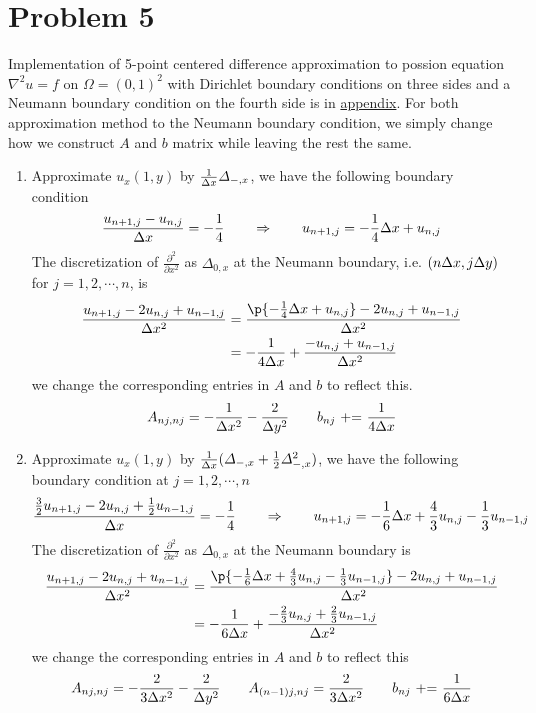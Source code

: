 \documentclass[11pt]{article}
\begin{document}
\section*{Problem 5}
Implementation of 5-point centered difference approximation to possion equation $\nabla^2 u = f$ on $\Omega = (0,1)^2$ with Dirichlet boundary conditions on three sides and a Neumann boundary condition on the fourth side is in \hyperref[q5code]{appendix}. For both approximation method to the Neumann boundary condition, we simply change how we construct $A$ and $b$ matrix while leaving the rest the same. 
\begin{enumerate}
    \item {} Approximate $u_x(1,y)$ by $\textstyle\frac{1}{\Delta x} \varDelta_{-,x}$, we have the following boundary condition
    \begin{equation}\label{eq1}
        \frac{u_{n+1,j} - u_{n,j}}{\Delta x} = -\frac{1}{4}
        \quad \quad \Rightarrow \quad \quad
        u_{n+1,j} = -\frac{1}{4} \Delta x + u_{n,j}
    \end{equation}
    The discretization of $\textstyle\frac{\partial^2}{\partial x^2}$ as $\varDelta_{0,x}$ at the Neumann boundary, i.e. $(n\Delta x, j\Delta y)$ for $j=1,2,\cdots,n$, is
    \begin{align*}
        \frac{u_{n+1,j} - 2u_{n,j} + u_{n-1,j}}{\Dx^2}
            &= \frac{\p{-\frac{1}{4} \Dx + u_{n,j}} - 2u_{n,j} + u_{n-1,j}}{\Dx^2} \\
            &= -\frac{1}{4\Dx} + \frac{-u_{n,j} + u_{n-1,j}}{\Dx^2}
    \end{align*}
    we change the corresponding entries in $A$ and $b$ to reflect this.
    \[
        A_{nj,nj} = -\frac{1}{\Delta x^2} - \frac{2}{\Delta y^2}
        \quad \quad
        b_{nj} \text{ += } \frac{1}{4\Delta x}
    \]
    \item {} Approximate $u_x(1,y)$ by $\textstyle\frac{1}{\Delta x} (\varDelta_{-,x} + \frac{1}{2} \varDelta^2_{-,x})$, we have the following boundary condition at $j=1,2,\cdots, n$
    \begin{equation} \label{eq2}
        \frac{\frac{3}{2} u_{n+1,j} - 2u_{n,j} + \frac{1}{2}u_{n-1,j}}{\Delta x} = -\frac{1}{4}
        \quad \quad \Rightarrow \quad \quad
        u_{n+1,j} = -\frac{1}{6} \Delta x + \frac{4}{3} u_{n,j} - \frac{1}{3} u_{n-1,j}
    \end{equation}
    The discretization of $\textstyle\frac{\partial^2}{\partial x^2}$ as $\varDelta_{0,x}$ at the Neumann boundary is
    \begin{align*}
        \frac{u_{n+1,j} - 2u_{n,j} + u_{n-1,j}}{\Dx^2}
            &= \frac{\p{
                -\frac{1}{6} \Dx + \frac{4}{3} u_{n,j} - \frac{1}{3} u_{n-1,j}
            } - 2u_{n,j} + u_{n-1,j}}{\Dx^2} \\
            &= -\frac{1}{6\Dx} + \frac{-\frac{2}{3} u_{n,j} + \frac{2}{3}u_{n-1,j}}{\Dx^2}
    \end{align*}
    we change the corresponding entries in $A$ and $b$ to reflect this
    \[
        A_{nj, nj} = -\frac{2}{3\Delta x^2} - \frac{2}{\Delta y^2}    
        \quad \quad
        A_{(n-1)j, nj} = \frac{2}{3\Delta x^2}
        \quad \quad
        b_{nj} \text{ += } \frac{1}{6\Delta x}
    \]
\end{enumerate}
\end{document}
